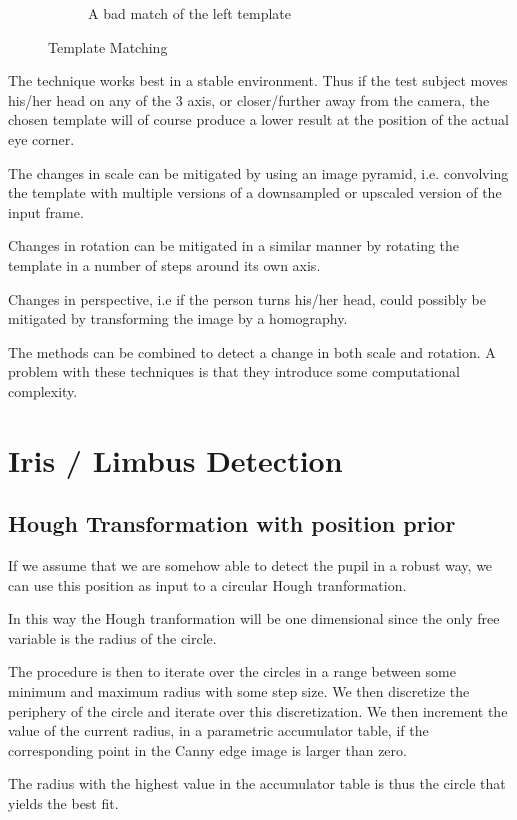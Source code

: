 \documentclass[a4paper,11pt]{article}
\begin{document}
\begin{figure}[H]
\begin{subfigure}{.32\textwidth}
  \caption{A bad match of the left template}
  \label{fig:templatemathing2}
\end{subfigure}
\caption{Template Matching }
\label{fig:templatemathing}
\end{figure}

The technique works best in a stable environment. Thus if the test subject moves his/her head on any of the 3 axis, or closer/further away from the camera, the chosen template will of course produce a lower result at the position of the actual eye corner.

The changes in scale can be mitigated by using an image pyramid, i.e. convolving the template with multiple versions of a downsampled or upscaled version of the input frame.

Changes in rotation can be mitigated in a similar manner by rotating the template in a number of steps around its own axis.

Changes in perspective, i.e if the person turns his/her head, could possibly be mitigated by transforming the image by a homography.

The methods can be combined to detect a change in both scale and rotation. A problem with these techniques is that they introduce some computational complexity.



\section{Iris / Limbus Detection}
\subsection{Hough Transformation with position prior}
If we assume that we are somehow able to detect the pupil in a robust way, we can use this position as input to a circular Hough tranformation.

In this way the Hough tranformation will be one dimensional since the only free variable is the radius of the circle.

The procedure is then to iterate over the circles in a range between some minimum and maximum radius with some step size. We then discretize the periphery of the circle and iterate over this discretization. We then increment the value of the current radius, in a parametric accumulator table, if the corresponding point in the Canny edge image is larger than zero.

The radius with the highest value in the accumulator table is thus the circle that yields the best fit.
\end{document}
